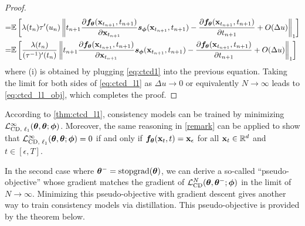\begin{appendices}
\begin{proof}
\begin{align}
        =& \mathbb{E}\left[\lambda(t_n)\tau'(u_{n})\left\lVert t_{n+1} \frac{\partial {\bm{f}}_{\bm{\theta}}({\mathbf{x}}_{t_{n+1}}, t_{n+1})}{\partial {\mathbf{x}}_{t_{n+1}}}{\bm{s}}_{\bm{\phi}}({\mathbf{x}}_{t_{n+1}}, t_{n+1})  - \frac{\partial {\bm{f}}_{\bm{\theta}}({\mathbf{x}}_{t_{n+1}}, t_{n+1})}{\partial t_{n+1}}  + O(\Delta u)\right\rVert_1\right]\notag\\
        =& \mathbb{E}\left[\frac{\lambda(t_n)}{(\tau^{-1})'(t_{n})}\left\lVert t_{n+1} \frac{\partial {\bm{f}}_{\bm{\theta}}({\mathbf{x}}_{t_{n+1}}, t_{n+1})}{\partial {\mathbf{x}}_{t_{n+1}}}{\bm{s}}_{\bm{\phi}}({\mathbf{x}}_{t_{n+1}}, t_{n+1})  - \frac{\partial {\bm{f}}_{\bm{\theta}}({\mathbf{x}}_{t_{n+1}}, t_{n+1})}{\partial t_{n+1}}  + O(\Delta u)\right\rVert_1\right]\label{eq:ctcd_l1}
    \end{align}
    where (i) is obtained by plugging \cref{eq:ctcd1} into the previous equation. Taking the limit for both sides of \cref{eq:ctcd_l1} as $\Delta u \to 0$ or equivalently $N\to \infty$ leads to \cref{eq:ctcd_l1_obj}, which completes the proof.
\end{proof}
\begin{remark}
    According to \cref{thm:ctcd_l1}, consistency models can be trained by minimizing $\mathcal{L}_\text{CD, $\ell_1$}^\infty({\bm{\theta}}, {\bm{\theta}}; {\bm{\phi}})$. Moreover, the same reasoning in \cref{remark} can be applied to show that $\mathcal{L}_\text{CD, $\ell_1$}^\infty({\bm{\theta}}, {\bm{\theta}}; {\bm{\phi}}) = 0$ if and only if ${\bm{f}}_{\bm{\theta}}({\mathbf{x}}_t, t) = {\mathbf{x}}_\epsilon$ for all ${\mathbf{x}}_t \in \mathbb{R}^d$ and $t \in [\epsilon, T]$.
\end{remark}

In the second case where ${\bm{\theta}}^- = \operatorname{stopgrad}({\bm{\theta}})$, we can derive a so-called ``pseudo-objective'' whose gradient matches the gradient of $\mathcal{L}_\text{CD}^N({\bm{\theta}}, {\bm{\theta}}^{-}; {\bm{\phi}})$ in the limit of $N\to\infty$. Minimizing this pseudo-objective with gradient descent gives another way to train consistency models via distillation. This pseudo-objective is provided by the theorem below.


\end{appendices}
